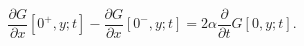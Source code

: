 \begin{equation}
\label{boundary3}
\frac{\partial G}{\partial x} [0^+, y; t] - 
\frac{\partial G}{\partial x} [0^-, y; t] = 2 \alpha 
\frac{\partial}{\partial t} G[0, y; t].
\end{equation}

